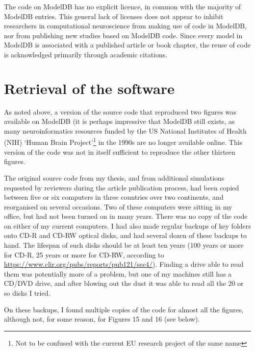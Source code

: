 The code on ModelDB has no explicit licence, in common with the majority of ModelDB entries.
This general lack of licenses does not appear to inhibit researchers in computational neuroscience from
making use of code in ModelDB, nor from publishing new studies based on ModelDB code.
Since every model in ModelDB is associated with a published article or book chapter,
the reuse of code is acknowledged primarily through academic citations.



\section{Retrieval of the software}


As noted above, a version of the source code that reproduced two figures was available on ModelDB
(it is perhaps impressive that ModelDB still exists, as many neuroinformatics resources funded by the
US National Institutes of Health (NIH) `Human Brain Project'\footnote{Not to be confused with the current EU research project of the same name}
in the 1990s are no longer available online.
This version of the code was not in itself sufficient to reproduce the other thirteen figures.

The original source code from my thesis, and from additional simulations requested by reviewers during the article publication process,
had been copied between five or six computers in three countries over two continents,
and reorganised on several occasions. Two of these computers were sitting in my office, but had not been turned on in many years.
There was no copy of the code on either of my current computers.
I had also made regular backups of key folders onto CD-R and CD-RW optical disks, and had several dozen of these backups to hand.
The lifespan of such disks should be at least ten years (100 years or more for CD-R, 25 years or more for CD-RW, according to \url{https://www.clir.org/pubs/reports/pub121/sec4/}). Finding a drive able to read them was potentially more of a problem, but one of my machines
still has a CD/DVD drive, and after blowing out the dust it was able to read all the 20 or so disks I tried.

On these backups, I found multiple copies of the code for almost all the figures, although not, for some reason, for Figures 15 and 16 (see below).

